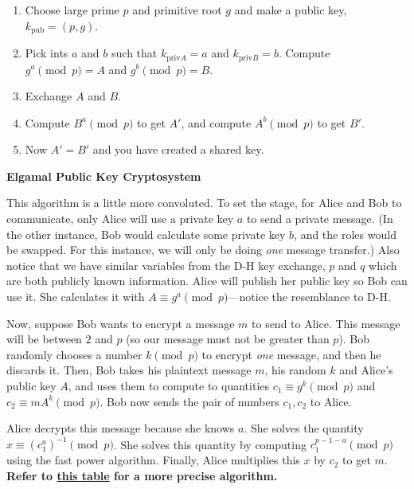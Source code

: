 \begin{enumerate}
    \item Choose large prime \(p\) and primitive root \(g\) and make a public key, \(k_{\text{pub}} = (p,g)\).
    \item Pick ints \(a\) and \(b\) such that \(k_{\text{priv} A} = a\) and \(k_{\text{priv} B} = b\). Compute \(g^a \pmod{p} = A\) and \(g^b \pmod{p} = B\).
    \item Exchange \(A\) and \(B\).
    \item Compute \(B^a \pmod{p}\) to get \(A'\), and compute \(A^b \pmod{p}\) to get \(B'\).
    \item Now \(A' = B'\) and you have created a shared key.
\end{enumerate}


\begin{center}
    \textbf{Elgamal Public Key Cryptosystem}
\end{center}

This algorithm is a little more convoluted. To set the stage, for Alice and Bob to communicate, only Alice will use a private key \(a\) to send a private message. (In the other instance, Bob would calculate some private key \(b\), and the roles would be swapped. For this instance, we will only be  doing \textit{one} message transfer.) Also notice that we have similar variables from the D-H key exchange, \(p\) and \(q\) which are both publicly known information. Alice will publish her public key so Bob can use it. She calculates it with \(A \equiv g^a \pmod{p}\)---notice the resemblance to D-H.

Now, suppose Bob wants to encrypt a message \(m\) to send to Alice. This message will be between \(2\) and \(p\) (so our message must not be greater than \(p\)). Bob randomly chooses a number \(k \pmod{p}\) to encrypt \textit{one} message, and then he discards it. Then, Bob takes his plaintext message \(m\), his random \(k\) and Alice's public key \(A\), and uses them to compute to quantities \(c_1 \equiv g^k \pmod{p}\) and \(c_2 \equiv mA^k \pmod{p}\). Bob now sends the pair of numbers \(c_1, c_2\) to Alice.

Alice decrypts this message because she knows \(a\). She solves the quantity \(x \equiv (c^a_1)^{-1} \pmod{p}\). She solves this quantity by computing \(c^{p - 1 - a}_1 \pmod{p}\) using the fast power algorithm. Finally, Alice multiplies this \(x\) by \(c_2\) to get \(m\). \textbf{Refer to \hyperlink{Elgamal}{this table} for a more precise algorithm.}

